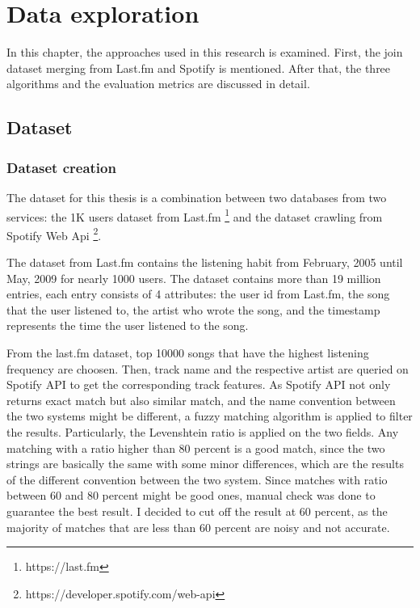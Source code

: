 \chapter{Data exploration} %

\label{Chapter3} %

In this chapter, the approaches used in this research is examined. First, the join dataset merging from Last.fm and Spotify is mentioned. After that, the three algorithms and the evaluation metrics are discussed in detail.

\section{Dataset}

\subsection{Dataset creation}
The dataset for this thesis is a combination between two databases from two services: the 1K users dataset from Last.fm \footnote{https://last.fm} and the dataset crawling from Spotify Web Api \footnote{https://developer.spotify.com/web-api}. 

The dataset from Last.fm contains the listening habit from February, 2005 until May, 2009 for nearly 1000 users. The dataset contains more than 19 million entries, each entry consists of 4 attributes: the user id from Last.fm, the song that the user listened to, the artist who wrote the song, and the timestamp represents the time the user listened to the song. 

From the last.fm dataset, top 10000 songs that have the highest listening frequency are choosen. Then, track name and the respective artist are queried on Spotify API to get the corresponding track features. As Spotify API not only returns exact match but also similar match, and the name convention between the two systems might be different, a fuzzy matching algorithm is applied to filter the results. Particularly, the Levenshtein ratio is applied on the two fields. Any matching with a ratio higher than 80 percent is a good match, since the two strings are basically the same with some minor differences, which are the results of the different convention between the two system. Since matches with ratio between 60 and 80 percent might be good ones, manual check was done to guarantee the best result. I decided to cut off the result at 60 percent, as the majority of matches that are less than 60 percent are noisy and not accurate.

